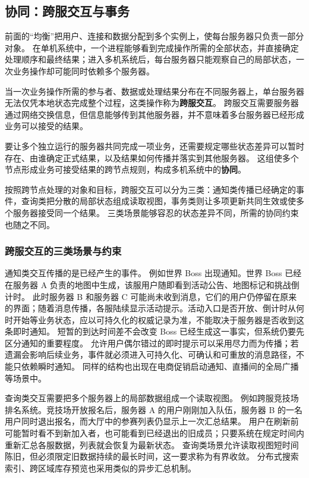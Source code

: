 \subsection{协同：跨服交互与事务}\label{sec4:cross-server-coordination}

前面的“均衡”把用户、连接和数据分配到多个实例上，使每台服务器只负责一部分对象。
在单机系统中，一个进程能够看到完成操作所需的全部状态，并直接确定处理顺序和最终结果；进入多机系统后，每台服务器只能观察自己的局部状态，一次业务操作却可能同时依赖多个服务器。

当一次业务操作所需的参与者、数据或处理结果分布在不同服务器上，单台服务器无法仅凭本地状态完成整个过程，这类操作称为\textbf{跨服交互}。
跨服交互需要服务器通过网络交换信息，但信息能够传到其他服务器，并不意味着多台服务器已经形成业务可以接受的结果。

要让多个独立运行的服务器共同完成一项业务，还需要规定哪些状态差异可以暂时存在、由谁确定正式结果，以及结果如何传播并落实到其他服务器。
这组使多个节点形成业务可接受结果的跨节点规则，构成多机系统中的\textbf{协同}。

按照跨节点处理的对象和目标，跨服交互可以分为三类：通知类传播已经确定的事件，查询类把分散的局部状态组成读取视图，事务类则让多项更新共同生效或使多个服务器接受同一个结果。
三类场景能够容忍的状态差异不同，所需的协同约束也随之不同。

\subsubsection{跨服交互的三类场景与约束}\label{sec4:cross-server-interaction-types}

通知类交互传播的是已经产生的事件。
例如世界 Boss 出现通知。世界 Boss 已经在服务器 A 负责的地图中生成，该服用户随即看到活动公告、地图标记和挑战倒计时。
此时服务器 B 和服务器 C 可能尚未收到消息，它们的用户仍停留在原来的界面；随着消息传播，各服陆续显示活动提示。活动入口是否开放、倒计时从何时开始等业务状态，应以可持久化的权威记录为准，不能取决于服务器是否收到这条即时通知。
短暂的到达时间差不会改变 Boss 已经生成这一事实，但系统仍要先区分通知的重要程度。
允许用户偶尔错过的即时提示可以采用尽力而为传播；若遗漏会影响后续业务，事件就必须进入可持久化、可确认和可重放的消息路径，不能只依赖瞬时通知。
同样的结构也出现在电商促销启动通知、直播间的全局广播等场景中。

查询类交互需要把多个服务器上的局部数据组成一个读取视图。
例如跨服竞技场排名系统。竞技场开放报名后，服务器 A 的用户刚刚加入队伍，服务器 B 的一名用户同时退出报名，而大厅中的参赛列表仍显示上一次汇总结果。
用户在刷新前可能暂时看不到新加入者，也可能看到已经退出的旧成员；只要系统在规定时间内重新汇总各服数据，列表就会恢复为最新状态。
查询类场景允许读取视图短时间陈旧，但必须限定旧数据持续的最长时间，这一要求称为有界收敛。
分布式搜索索引、跨区域库存预览也采用类似的异步汇总机制。

